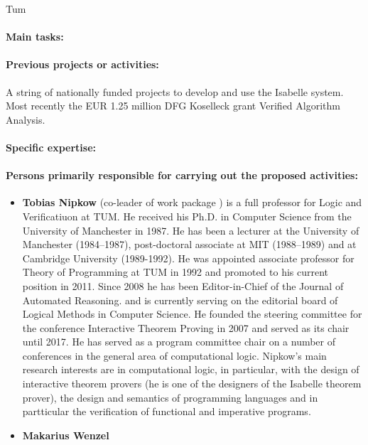 \begin{sitedescription}{Tum}
\paragraph{Main tasks:}

\begin{compactitem}
\item{} 
\end{compactitem}


\paragraph{Previous projects or activities:}

A string of nationally funded projects to develop and use the Isabelle
system. Most recently the EUR 1.25 million DFG Koselleck grant Verified Algorithm Analysis.

\paragraph{Specific expertise:}

\begin{compactitem}
\item {}
\end{compactitem}

\paragraph{Persons primarily responsible for carrying out the proposed activities:}

\begin{itemize}
\item \textbf{Tobias Nipkow} (co-leader of work package
  ) is a full professor for Logic and
  Verificatiuon at TUM. He received his Ph.D. in Computer Science
  from the University of Manchester in 1987.  He has been a
  lecturer at the University of Manchester (1984--1987),
  post-doctoral associate at MIT (1988--1989) and at Cambridge
  University (1989-1992). He was appointed associate professor for Theory of Programming at
  TUM in 1992 and promoted to his current position in 2011. Since 2008
  he has been Editor-in-Chief of the  Journal of Automated Reasoning.
 and is currently serving on the editorial board of Logical Methods in
 Computer Science. He founded the steering committee for the
 conference Interactive Theorem Proving in 2007 and served as its
 chair until 2017.
 He has served as a program committee chair
on a number of conferences in the general area of computational logic.  Nipkow's main research
interests are in computational logic, in particular, with the design of
interactive theorem provers (he is one of the designers of the
Isabelle theorem prover), the design and semantics of programming
languages and in partticular the verification of functional and
imperative programs.
\item \textbf{Makarius Wenzel}
\end{itemize}


\end{sitedescription}
